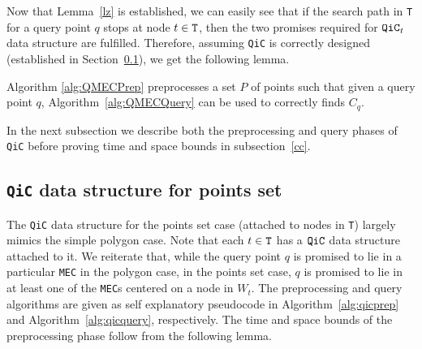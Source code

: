 \documentclass[12pt]{llncs}
\begin{document}
Now that Lemma\ \ref{lz} is established, we can easily see that if the search path in {\tt T} for a query point $q$ stops at node $t \in {\tt T}$, then the two promises required for ${\tt QiC}_t$ data structure are fulfilled. Therefore, assuming {\tt QiC} is correctly designed (established in Section\ \ref{sec:QiC-1}), we get the following lemma. 
\begin{lemma}\label{lem:qmeccorrect}
Algorithm \ref{alg:QMECPrep} preprocesses a set $P$ of points such that given a query point $q$, Algorithm\ \ref{alg:QMECQuery} can be used to correctly finds $C_q$.
\end{lemma}
In the next subsection we describe both the preprocessing and query phases of {\tt QiC} before proving time and space bounds in subsection\ \ref{cc}. 


\subsection{{\tt QiC} data structure for points set} \label{sec:QiC-1}

The {\tt QiC} data structure for the points set case (attached to nodes in {\tt T}) largely mimics the simple polygon case. Note that each $t \in {\tt T}$ has a ${\tt QiC}$ data structure attached to it. We reiterate that, while the query point $q$ is promised to lie in a particular {\tt MEC} in the polygon case, in the points set case, $q$ is promised to lie in at least one of the {\tt MEC}s centered on a node in $W_t$. 
The preprocessing and query algorithms are given as self explanatory pseudocode in Algorithm\ \ref{alg:qicprep} and Algorithm\ \ref{alg:qicquery}, respectively. The time and space bounds of the preprocessing phase follow from the following lemma.
\end{document}
